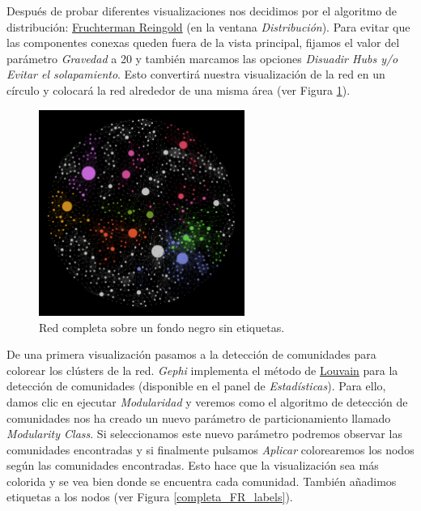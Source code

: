 \documentclass{uimppracticas}
\begin{document}
Después de probar diferentes visualizaciones nos decidimos por el algoritmo de distribución: \href{https://github.com/gephi/gephi/wiki/Fruchterman-Reingold}{Fruchterman Reingold}\cite{fruchterman1991graph} (en la ventana \textit{Distribución}). Para evitar que las componentes conexas queden fuera de la vista principal, fijamos el valor del parámetro \textit{Gravedad} a 20 y también marcamos las opciones \textit{Disuadir Hubs y/o Evitar el solapamiento}. Esto convertirá nuestra visualización de la red en un círculo y colocará la red alrededor de una misma área (ver Figura \ref{completa_negro_FR}). 

\begin{figure}[H]
	\centering
	\includegraphics[width=0.6\textwidth]{images/completa_negro_FR}
	\caption{Red completa sobre un fondo negro sin etiquetas.}
	\label{completa_negro_FR}
\end{figure}

De una primera visualización pasamos a la detección de comunidades para colorear los clústers de la red. \textit{Gephi} implementa el método de \href{http://perso.uclouvain.be/vincent.blondel/research/louvain.html}{Louvain}\cite{Blondel2008} para la detección de comunidades (disponible en el panel de \textit{Estadísticas}). Para ello, damos clic en ejecutar \textit{Modularidad} y veremos como el algoritmo de detección de comunidades nos ha creado un nuevo parámetro de particionamiento llamado \textit{Modularity Class}. Si seleccionamos este nuevo parámetro podremos observar las comunidades encontradas y si finalmente pulsamos \textit{Aplicar} colorearemos los nodos según las comunidades encontradas. Esto hace que la visualización sea más colorida y se vea bien donde se encuentra cada comunidad. También añadimos etiquetas a los nodos (ver Figura \ref{completa_FR_labels}). 
\end{document}
